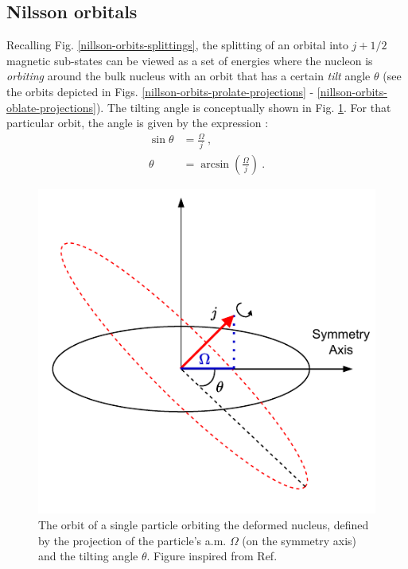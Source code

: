 \subsection{Nilsson orbitals}

Recalling Fig. \ref{nillson-orbits-splittings}, the splitting of an orbital into $j+1/2$ magnetic sub-states can be viewed as a set of energies where the nucleon is \emph{orbiting} around the bulk nucleus with an orbit that has a certain \emph{tilt} angle $\theta$ (see the orbits depicted in Figs. \ref{nillson-orbits-prolate-projections} - \ref{nillson-orbits-oblate-projections}). The tilting angle is conceptually shown in Fig. \ref{fig-nilsson-tilting-angle}. For that particular orbit, the angle is given by the expression \cite{krane1991introductory,casten2000nuclear}:
\begin{align}
    \sin\theta&=\frac{\Omega}{j}\ , \nonumber\\
    \theta&=\arcsin(\frac{\Omega}{j})\ .
    \label{theta-tilting-angle}
\end{align}
\begin{figure}
    \centering
    \includegraphics[scale=1]{Chapters/Figures/nilsson_tilting_angle.pdf}
    \caption{The orbit of a single particle orbiting the deformed nucleus, defined by the projection of the particle's a.m. $\Omega$ (on the symmetry axis) and the tilting angle $\theta$. Figure inspired from Ref. \cite{casten2000nuclear}}
    \label{fig-nilsson-tilting-angle}
\end{figure}

